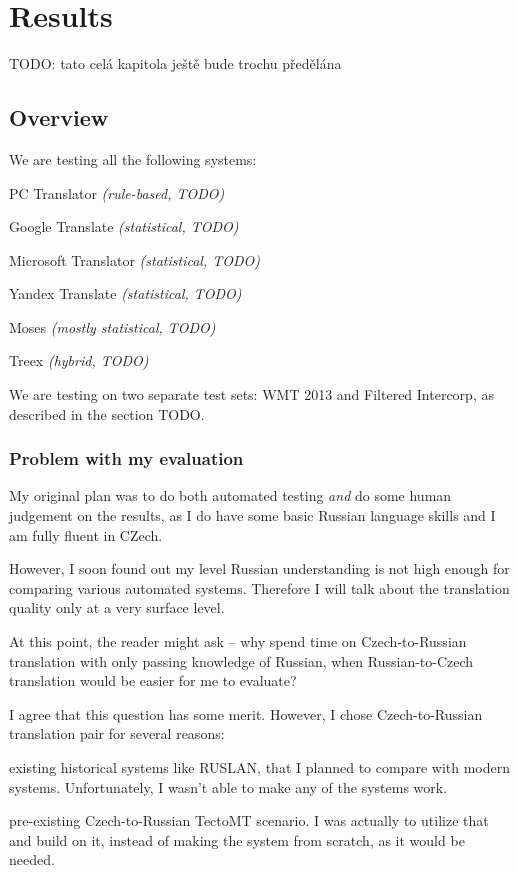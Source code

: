 \chapter{Results}
TODO: tato celá kapitola ještě bude trochu předělána

\section{Overview}
\label{overvieweval}
We are testing all the following systems:
\begin{pitemize}
\item PC Translator \emph{(rule-based, TODO)}
\item Google Translate \emph{(statistical, TODO)}
\item Microsoft Translator \emph{(statistical, TODO)}
\item Yandex Translate \emph{(statistical, TODO)}
\item Moses \emph{(mostly statistical, TODO)}
\item Treex \emph{(hybrid, TODO)}
\end{pitemize}

We are testing on two separate test sets: WMT 2013 and Filtered Intercorp, as described in the section TODO.

\subsection{Problem with my evaluation}
My original plan was to do both automated testing \emph{and} do some human judgement on the results, as I do have some basic Russian language skills and I am fully fluent in CZech.

However, I soon found out my level Russian understanding is not high enough for comparing various automated systems. Therefore I will talk about the translation quality only at a very surface level.

At this point, the reader might ask -- why spend time on Czech-to-Russian translation with only passing knowledge of Russian, when Russian-to-Czech translation would be easier for me to evaluate?

I agree that this question has some merit. However, I chose Czech-to-Russian translation pair for several reasons:
\begin{pitemize}
\item existing historical systems like RUSLAN, that I planned to compare with modern systems. Unfortunately, I wasn't able to make any of the systems work.
\item pre-existing Czech-to-Russian TectoMT scenario. I was actually to utilize that and build on it, instead of making the system from scratch, as it would be needed.
\end{pitemize}

